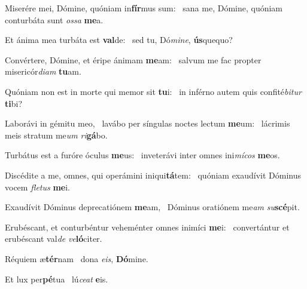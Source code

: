 \item Miserére mei, Dómine, quóniam in\textbf{fír}mus sum:~\psstar{} sana me, Dómine, quóniam conturbáta sunt \textit{os}\textit{sa} \textbf{me}a.

\item Et ánima mea turbáta est \textbf{val}de:~\psstar{} sed tu, Dó\textit{mi}\textit{ne}, \textbf{ús}quequo?

\item Convértere, Dómine, et éripe ánimam \textbf{me}am:~\psstar{} salvum me fac propter misericór\textit{di}\textit{am} \textbf{tu}am.

\item Quóniam non est in morte qui memor sit \textbf{tu}i:~\psstar{} in inférno autem quis confité\textit{bi}\textit{tur} \textbf{ti}bi?

\item Laborávi in gémitu meo,~\pscross{} lavábo per síngulas noctes lectum \textbf{me}um:~\psstar{} lácrimis meis stratum me\textit{um} \textit{ri}\textbf{gá}bo.

\item Turbátus est a furóre óculus \textbf{me}us:~\psstar{} inveterávi inter omnes ini\textit{mí}\textit{cos} \textbf{me}os.

\item Discédite a me, omnes, qui operámini iniqui\textbf{tá}tem:~\psstar{} quóniam exaudívit Dóminus vocem \textit{fle}\textit{tus} \textbf{me}i.

\item Exaudívit Dóminus deprecatiónem \textbf{me}am,~\psstar{} Dóminus oratiónem me\textit{am} \textit{su}\textbf{scé}pit.

\item Erubéscant, et conturbéntur veheménter omnes inimíci \textbf{me}i:~\psstar{} convertántur et erubéscant val\textit{de} \textit{ve}\textbf{ló}citer.

\item Réquiem æ\textbf{tér}nam~\psstar{} dona \textit{e}\textit{is}, \textbf{Dó}mine.

\item Et lux per\textbf{pé}tua~\psstar{} lú\textit{ce}\textit{at} \textbf{e}is.